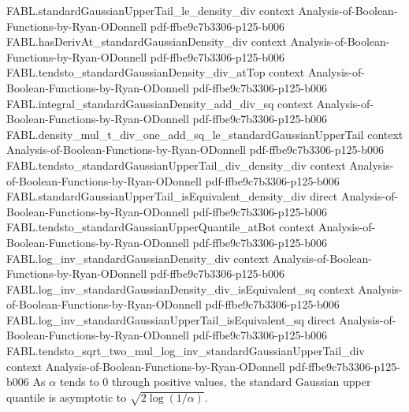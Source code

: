 \begin{theorem}
\proofstep
  {FABL.standardGaussianUpperTail_le_density_div}
  {context}
  {Analysis-of-Boolean-Functions-by-Ryan-ODonnell}
  {pdf-ffbe9c7b3306-p125-b006}
\proofstep
  {FABL.hasDerivAt_standardGaussianDensity_div}
  {context}
  {Analysis-of-Boolean-Functions-by-Ryan-ODonnell}
  {pdf-ffbe9c7b3306-p125-b006}
\proofstep
  {FABL.tendsto_standardGaussianDensity_div_atTop}
  {context}
  {Analysis-of-Boolean-Functions-by-Ryan-ODonnell}
  {pdf-ffbe9c7b3306-p125-b006}
\proofstep
  {FABL.integral_standardGaussianDensity_add_div_sq}
  {context}
  {Analysis-of-Boolean-Functions-by-Ryan-ODonnell}
  {pdf-ffbe9c7b3306-p125-b006}
\proofstep
  {FABL.density_mul_t_div_one_add_sq_le_standardGaussianUpperTail}
  {context}
  {Analysis-of-Boolean-Functions-by-Ryan-ODonnell}
  {pdf-ffbe9c7b3306-p125-b006}
\proofstep
  {FABL.tendsto_standardGaussianUpperTail_div_density_div}
  {context}
  {Analysis-of-Boolean-Functions-by-Ryan-ODonnell}
  {pdf-ffbe9c7b3306-p125-b006}
\proofstep
  {FABL.standardGaussianUpperTail_isEquivalent_density_div}
  {direct}
  {Analysis-of-Boolean-Functions-by-Ryan-ODonnell}
  {pdf-ffbe9c7b3306-p125-b006}
\proofstep
  {FABL.tendsto_standardGaussianUpperQuantile_atBot}
  {context}
  {Analysis-of-Boolean-Functions-by-Ryan-ODonnell}
  {pdf-ffbe9c7b3306-p125-b006}
\proofstep
  {FABL.log_inv_standardGaussianDensity_div}
  {context}
  {Analysis-of-Boolean-Functions-by-Ryan-ODonnell}
  {pdf-ffbe9c7b3306-p125-b006}
\proofstep
  {FABL.log_inv_standardGaussianDensity_div_isEquivalent_sq}
  {context}
  {Analysis-of-Boolean-Functions-by-Ryan-ODonnell}
  {pdf-ffbe9c7b3306-p125-b006}
\proofstep
  {FABL.log_inv_standardGaussianUpperTail_isEquivalent_sq}
  {direct}
  {Analysis-of-Boolean-Functions-by-Ryan-ODonnell}
  {pdf-ffbe9c7b3306-p125-b006}
\proofstep
  {FABL.tendsto_sqrt_two_mul_log_inv_standardGaussianUpperTail_div}
  {context}
  {Analysis-of-Boolean-Functions-by-Ryan-ODonnell}
  {pdf-ffbe9c7b3306-p125-b006}
As $\alpha$ tends to $0$ through positive values, the standard Gaussian upper quantile
is asymptotic to $\sqrt{2\log(1/\alpha)}$.
\end{theorem}

